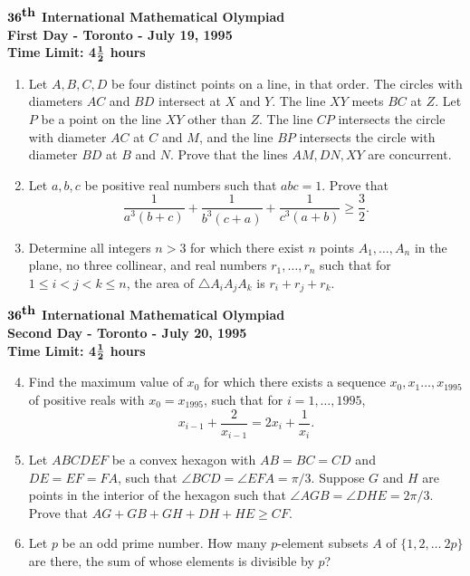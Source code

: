 \setlength{\baselineskip}{0.25in}
\setlength{\leftmargin}{0.0in}
\setlength{\textwidth}{6.5in}
\setlength{\topmargin}{0.0in}
\setlength{\textheight}{9in}
\setlength{\headheight}{0.0in}
\setlength{\headsep}{0.0in}
\setlength{\oddsidemargin}{0.0in}



\begin{center}
${\bf 36}^{\mbox{\bf th}}$
{\bf International Mathematical Olympiad} \\[.1in]
{\bf First Day - Toronto - July 19, 1995} \\
{\bf Time Limit: 4}${{\bf 1}\over{\bf 2}}$ {\bf 
hours} 
\end{center}
\begin{enumerate}
\item
Let $A,B,C, D$ be four distinct points on a line, in that order. The 
circles with diameters $AC$ and $BD$ intersect at $X$ and $Y$. 
The line $XY$ meets $BC$ at $Z$. Let $P$ be a point on the line 
$XY$ other than $Z$. The line $CP$ intersects the circle with diameter 
$AC$ at $C$ and $M$, and the line $BP$ intersects the circle 
with diameter $BD$ at $B$ and $N$. Prove that the lines $AM, 
DN, XY$ are concurrent.
\item
Let $a, b, c$ be positive real numbers such that $abc = 1$. Prove that
\[
\frac{1}{a^3(b+c)} + \frac{1}{b^3(c+a)} + \frac{1}{c^3(a+b)} \geq \frac{3}{2}.
\]
\item
Determine all integers $n > 3$ for which there exist $n$ points $A_1, 
\dots, A_n$ in the plane, no three collinear, and real numbers $r_1, \dots, 
r_n$ such that for $1 \leq i <j< k \leq n$, the area of $\triangle 
A_iA_jA_k$ is $r_i + r_j + r_k$.
\end{enumerate}

\begin{center}
${\bf 36}^{\mbox{\bf th}}$
{\bf International Mathematical Olympiad} \\[.1in]
{\bf Second Day - Toronto - July 20, 1995} \\
{\bf Time Limit: 4}${{\bf 1}\over{\bf 2}}$ {\bf 
hours} 
\end{center}
\begin{enumerate}
\setcounter{enumi}{3}
\item
Find the maximum value of $x_0$ for which there exists a sequence $x_0, x_1
\dots, x_{1995}$ of positive reals with $x_0 = x_{1995}$, such that
for $i = 1, \dots, 1995$,
\[
x_{i-1} + \frac{2}{x_{i-1}} = 2x_i + \frac{1}{x_i}.
\]
\item
Let $ABCDEF$ be a convex hexagon with $AB=BC=CD$ and $DE=EF=FA$, such 
that $\angle BCD = \angle EFA = \pi/3$. Suppose $G$ and $H$ are points in 
the interior of the hexagon such that $\angle AGB = \angle DHE = 2\pi/3$. 
Prove that $AG + GB + GH + DH + HE \geq CF$.
\item
Let $p$ be an odd prime number. How many $p$-element subsets 
$A$ of $\{1, 2, \dots\ 2p\}$ are there, the sum of whose elements is 
divisible by $p$?
\end{enumerate}



